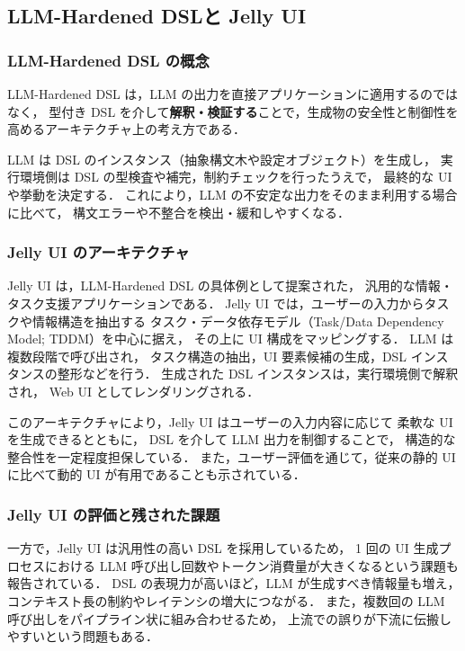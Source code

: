 \documentclass[a4paper,10pt]{jarticle}
\begin{document}
\subsection{LLM-Hardened DSLと Jelly UI}

\subsubsection{LLM-Hardened DSL の概念}

LLM-Hardened DSL は，LLM の出力を直接アプリケーションに適用するのではなく，
型付き DSL を介して\textbf{解釈・検証する}ことで，生成物の安全性と制御性を高めるアーキテクチャ上の考え方である\cite{deanmai2025dsl}．

LLM は DSL のインスタンス（抽象構文木や設定オブジェクト）を生成し，
実行環境側は DSL の型検査や補完，制約チェックを行ったうえで，
最終的な UI や挙動を決定する．
これにより，LLM の不安定な出力をそのまま利用する場合に比べて，
構文エラーや不整合を検出・緩和しやすくなる．

\subsubsection{Jelly UI のアーキテクチャ}

Jelly UI は，LLM-Hardened DSL の具体例として提案された，
汎用的な情報・タスク支援アプリケーションである\cite{cao2025jelly}．
Jelly UI では，ユーザーの入力からタスクや情報構造を抽出する
タスク・データ依存モデル（Task/Data Dependency Model; TDDM）を中心に据え，
その上に UI 構成をマッピングする．
LLM は複数段階で呼び出され，
タスク構造の抽出，UI 要素候補の生成，DSL インスタンスの整形などを行う．
生成された DSL インスタンスは，実行環境側で解釈され，
Web UI としてレンダリングされる．

このアーキテクチャにより，Jelly UI はユーザーの入力内容に応じて
柔軟な UI を生成できるとともに，
DSL を介して LLM 出力を制御することで，
構造的な整合性を一定程度担保している．
また，ユーザー評価を通じて，従来の静的 UI に比べて動的 UI が有用であることも示されている．

\subsubsection{Jelly UI の評価と残された課題}

一方で，Jelly UI は汎用性の高い DSL を採用しているため，
1 回の UI 生成プロセスにおける LLM 呼び出し回数やトークン消費量が大きくなるという課題も報告されている．
DSL の表現力が高いほど，LLM が生成すべき情報量も増え，
コンテキスト長の制約やレイテンシの増大につながる\cite{du2025context}．
また，複数回の LLM 呼び出しをパイプライン状に組み合わせるため，
上流での誤りが下流に伝搬しやすいという問題もある．
\end{document}
